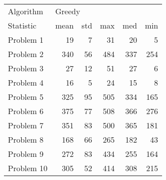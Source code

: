 \begin{tabular}{lrrrrr}
\toprule
Algorithm & \multicolumn{5}{l}{Greedy} \\
Statistic &   mean & std &  max &  med &  min \\
\midrule
Problem 1  &     19 &   7 &   31 &   20 &    5 \\
Problem 2  &    340 &  56 &  484 &  337 &  254 \\
Problem 3  &     27 &  12 &   51 &   27 &    6 \\
Problem 4  &     16 &   5 &   24 &   15 &    8 \\
Problem 5  &    325 &  95 &  505 &  334 &  165 \\
Problem 6  &    375 &  77 &  508 &  366 &  276 \\
Problem 7  &    351 &  83 &  500 &  365 &  181 \\
Problem 8  &    168 &  66 &  265 &  182 &   43 \\
Problem 9  &    272 &  83 &  434 &  255 &  164 \\
Problem 10 &    305 &  52 &  414 &  308 &  215 \\
\bottomrule
\end{tabular}
